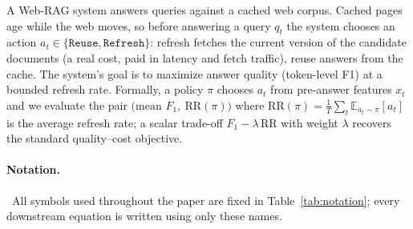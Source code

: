 \documentclass[pdflatex,sn-basic]{sn-jnl}
\begin{document}
A Web-RAG system answers queries against a cached web corpus. Cached pages age while the web moves, so before answering a query $q_t$ the system chooses an action $a_t \in \{\texttt{Reuse}, \texttt{Refresh}\}$: refresh fetches the current version of the candidate documents (a real cost, paid in latency and fetch traffic), reuse answers from the cache. The system's goal is to maximize answer quality (token-level F1) at a bounded refresh rate. Formally, a policy $\pi$ chooses $a_t$ from pre-answer features $x_t$ and we evaluate the pair $\big(\text{mean } F_1,\ \mathrm{RR}(\pi)\big)$ where $\mathrm{RR}(\pi)=\frac{1}{T}\sum_t \mathbb{E}_{a_t\sim\pi}[a_t]$ is the average refresh rate; a scalar trade-off $F_1 - \lambda\,\mathrm{RR}$ with weight $\lambda$ recovers the standard quality--cost objective.

\paragraph*{Notation.}~All symbols used throughout the paper are fixed in Table~\ref{tab:notation}; every downstream equation is written using only these names.
\end{document}
